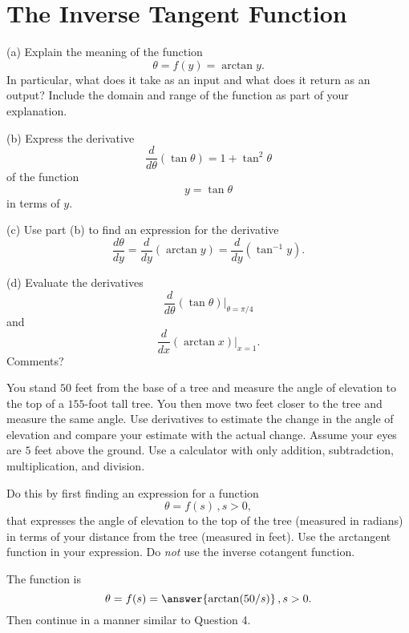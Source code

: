 \documentclass{ximera}
\begin{document}
\section*{The Inverse Tangent Function}
\begin{question}  \label{Q:KKDbret434}
(a) Explain the meaning of the function
\[
        \theta = f(y) = \arctan y .
\]
In particular, what does it take as an input and what does it return as an output? Include the domain and range of the function as part of your explanation.

(b) Express the derivative
\[
     \frac{d}{d\theta} \left( \tan\theta  \right) = 1 + \tan^2\theta
\]
of the function 
\[
    y = \tan\theta
\]
in terms of $y$.

(c) Use part (b) to find an expression for the derivative
\[
   \frac{d\theta}{dy} = \frac{d}{dy} \left(  \arctan y \right) =  \frac{d}{dy} \left(  \tan^{-1} y \right) .
\]

(d) Evaluate the derivatives
\[
   \frac{d}{d\theta} \left( \tan\theta  \right)\Big|_{\theta = \pi/4}
\]
and
\[
  \frac{d}{dx} \left(  \arctan x \right)\Big|_{x=1} . 
\]
Comments?
\end{question}

\begin{question}  \label{Q45544fhL}
You stand $50$ feet from the base of a tree and measure the angle of elevation to the top of a $155$-foot tall tree. You then move two feet closer to the tree and measure the same angle. Use derivatives to estimate the change in the angle of elevation and compare your estimate with the actual change. Assume your eyes are $5$ feet above the ground. Use a calculator with only addition, subtradction, multiplication, and division.

Do this by first finding an expression for a function
\[
    \theta = f(s) \, , s>0 ,
\]
that expresses the angle of elevation to the top of the tree (measured in radians) in terms of your distance from the tree (measured in feet). Use the arctangent function in your expression. Do \emph{not} use the inverse cotangent function.

The function is 
\[
      \theta = f(s)  = \answer{\arctan(50/s)} \, , s>0 .
\]
Then continue in a manner similar to Question 4.

\end{question}
\end{document}
